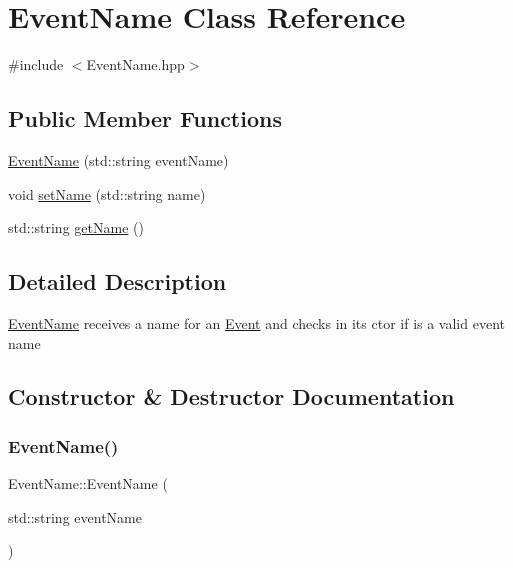 \hypertarget{class_event_name}{}\section{Event\+Name Class Reference}
\label{class_event_name}


{\ttfamily \#include $<$Event\+Name.\+hpp$>$}

\subsection*{Public Member Functions}
\begin{DoxyCompactItemize}
\item 
\mbox{\hyperlink{class_event_name_a4e06946f2076c5edf7b909971c1a88b8}{Event\+Name}} (std\+::string event\+Name)
\item 
void \mbox{\hyperlink{class_event_name_a56c6c083913f99731f27a2becfd43672}{set\+Name}} (std\+::string name)
\item 
std\+::string \mbox{\hyperlink{class_event_name_a6ffddc64722014b6d4fdc9d0b5c4c0f2}{get\+Name}} ()
\end{DoxyCompactItemize}


\subsection{Detailed Description}
\mbox{\hyperlink{class_event_name}{Event\+Name}} receives a name for an \mbox{\hyperlink{class_event}{Event}} and checks in its ctor if is a valid event name 

\subsection{Constructor \& Destructor Documentation}
\mbox{\label{class_event_name_a4e06946f2076c5edf7b909971c1a88b8}} 
\subsubsection{\texorpdfstring{EventName()}{EventName()}}
{\footnotesize\ttfamily Event\+Name\+::\+Event\+Name (\begin{DoxyParamCaption}\item[{std\+::string}]{event\+Name }\end{DoxyParamCaption})}



